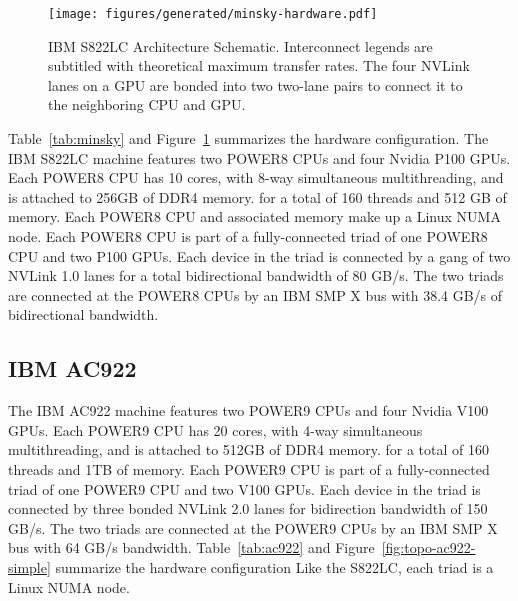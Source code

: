 \begin{figure}[ht]
    \centering
	\texttt{[image: figures/generated/minsky-hardware.pdf]}
    \caption[IBM S822LC Architecture Schematic]{
		IBM S822LC Architecture Schematic.
		Interconnect legends are subtitled with theoretical maximum transfer rates.
		The four NVLink lanes on a GPU are bonded into two two-lane pairs to connect it to the neighboring CPU and GPU.
	}
    \label{fig:topo-minsky-simple}
\end{figure}

Table~\ref{tab:minsky} and Figure~\ref{fig:topo-minsky-simple} summarizes the hardware configuration.
The IBM S822LC machine features two POWER8 CPUs and four Nvidia P100 GPUs\cite{caldeira2016s822lc}.
Each POWER8 CPU has 10 cores, with 8-way simultaneous multithreading, and is attached to 256GB of DDR4 memory. for a total of 160 threads and 512 GB of memory.
Each POWER8 CPU and associated memory make up a Linux NUMA node.
Each POWER8 CPU is part of a fully-connected triad of one POWER8 CPU and two P100 GPUs.
Each device in the triad is connected by a gang of two NVLink 1.0 lanes for a total bidirectional bandwidth of 80 GB/s.
The two triads are connected at the POWER8 CPUs by an IBM SMP X bus with 38.4 GB/s of bidirectional bandwidth.



\subsection{IBM AC922}
\label{sec:ac922}

The IBM AC922 machine features two POWER9 CPUs and four Nvidia V100 GPUs\cite{caldeira2018ac922}.
Each POWER9 CPU has 20 cores, with 4-way simultaneous multithreading, and is attached to 512GB of DDR4 memory. for a total of 160 threads and 1TB of memory.
Each POWER9 CPU is part of a fully-connected triad of one POWER9 CPU and two V100 GPUs.
Each device in the triad is connected by three bonded NVLink 2.0 lanes for bidirection bandwidth of 150 GB/s.
The two triads are connected at the POWER9 CPUs by an IBM SMP X bus with 64 GB/s bandwidth.
Table~\ref{tab:ac922} and Figure~\ref{fig:topo-ac922-simple} summarize the hardware configuration
Like the S822LC, each triad is a Linux NUMA node.


